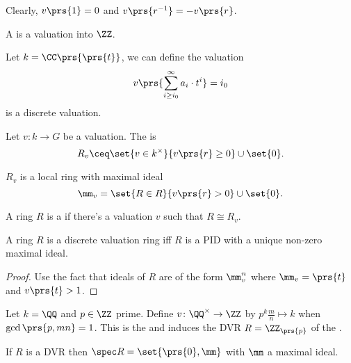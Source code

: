\documentclass[10pt,a4paper,twoside,openany,hidelinks]{book}
\begin{document}
\begin{remark}
Clearly, $v\prs{1} = 0$ and $v\prs{r^{-1}} = -v\prs{r}$.
\end{remark}

\begin{definition}
A  is a valuation into $\ZZ$.
\end{definition}

\begin{example}
Let $k = \CC\prs{\prs{t}}$, we can define the valuation
$$v \prs{\sum_{i \geq i_0}^\infty a_i \cdot t^i} = i_0$$
is a discrete valuation.
\end{example}

\begin{definition}
Let $v \colon k \to G$ be a valuation. The  is
$$R_v \ceq \set{v \in k^\times}{v\prs{r} \geq 0} \cup \set{0} \text{.}$$
\end{definition}

\begin{remark}
$R_v$ is a local ring with maximal ideal
$$\mm_v = \set{R \in R}{v\prs{r} > 0} \cup \set{0} \text{.}$$
\end{remark}

\begin{definition}
A ring $R$ is a  if there's a valuation $v$ such that $R \cong R_v$.
\end{definition}

\begin{lemma}
A ring $R$ is a discrete valuation ring iff $R$ is a PID with a unique non-zero maximal ideal.
\end{lemma}

\begin{proof}
Use the fact that ideals of $R$ are of the form $\mm_v^n$ where $\mm_v = \prs{t}$ and $v\prs{t} > 1$.
\end{proof}

\begin{example}
Let $k = \QQ$ and $p \in \ZZ$ prime. Define
$v \colon \QQ^\times \to \ZZ$ by $p^k \frac{m}{n} \mapsto k$ when $\gcd\prs{p,mn} = 1$. This is the  and induces the DVR $R = \ZZ_{\prs{p}}$ of the .
\end{example}

\begin{remark}
If $R$ is a DVR then $\spec R = \set{\prs{0}, \mm}$ with $\mm$ a maximal ideal.
\end{remark}
\end{document}
